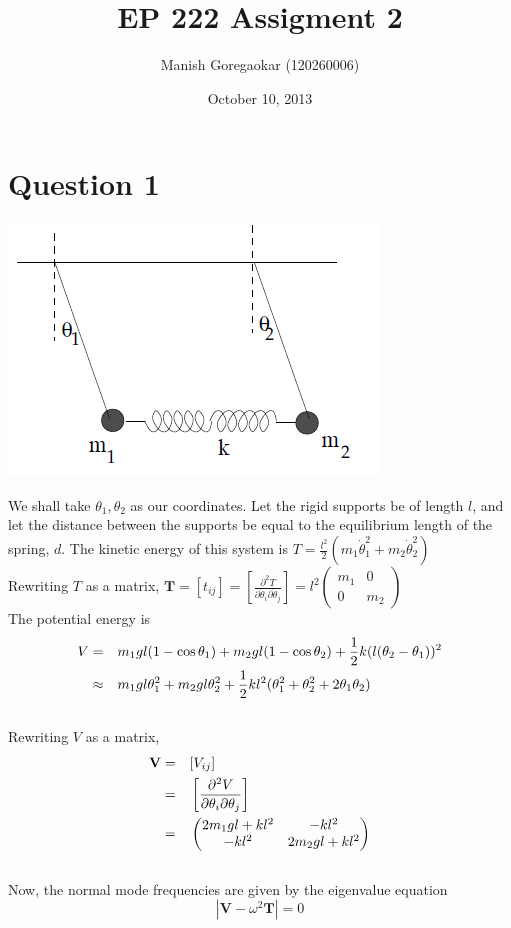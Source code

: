 \documentclass[12pt]{article}
\title{EP 222 Assigment 2}
\date{October 10, 2013}
\author{Manish Goregaokar (120260006)}
\begin{document}
\maketitle

\section{Question 1}

\includegraphics[scale=1]{1.png}


We shall take $\theta_1,\theta_2$ as our coordinates. Let the rigid supports be of length $l$, and let the distance between the supports be equal to the equilibrium length of the spring, $d$. The kinetic energy of this system is $T=\frac{l^2}2(m_1\dot\theta_1^2+m_2\dot\theta_2^2)$\\
Rewriting $T$ as a matrix, $\mathbf T=[t_{ij}]=\left[\frac{\partial^2 T}{\partial \dot\theta_i\partial \dot\theta_j}\right]=l^2\begin{pmatrix}
m_1 & 0\\
0 & m_2
\end{pmatrix}$\\

The potential energy is \begin{align}V &=& &m_1gl(1-\cos\theta_1)+m_2gl(1-\cos\theta_2)+\frac12k(l(\theta_2-\theta_1))^2\notag\\ &\approx & &m_1gl\theta_1^2 +m_2gl\theta_2^2+\frac12kl^2(\theta_1^2+\theta_2^2+2\theta_1\theta_2)\notag
\end{align}
\\ Rewriting $V$ as a matrix, \begin{align}\mathbf V &=& &[V_{ij}]\notag\\ &=& &\left[\frac{\partial^2 V}{\partial \theta_i\partial \theta_j}\right]\notag\\ &=& &\begin{pmatrix}
2m_1gl+kl^2 & -kl^2\\
-kl^2 & 2m_2gl+kl^2
\end{pmatrix}\notag
\end{align}\\
Now, the normal mode frequencies are given by the eigenvalue equation $$|\mathbf V-\omega^2\mathbf T|=0$$
\end{document}
